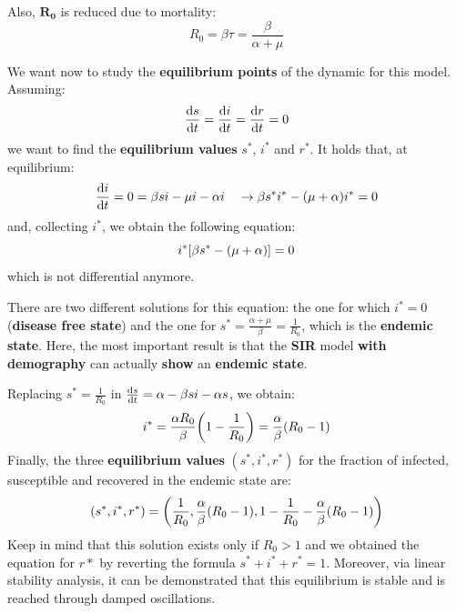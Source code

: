 \documentclass[../main/main.tex]{subfiles}
\begin{document}
Also, \( \mathbf{R_0} \) is reduced due to mortality:
\begin{equation}
  R_0 = \beta \tau = \frac{\beta }{\alpha + \mu }
\end{equation}

We want now to study the \textbf{equilibrium points} of the dynamic for this model. Assuming:
\begin{equation*}
  \dv{s}{t} = \dv{i}{t} = \dv{r}{t} = 0
\end{equation*}
we want to find the \textbf{equilibrium values}  \( s^* \), \( i^* \) and \( r^* \).
It holds that, at equilibrium:
\begin{equation*}
  \dv{i}{t} = 0 = \beta s i - \mu i - \alpha i \quad \rightarrow   \beta s^* i^* - (\mu + \alpha ) i^* = 0
\end{equation*}
and, collecting $i^*$, we obtain the following equation:
\begin{equation}
  i^* \qty[\beta s^* - (\mu + \alpha )] = 0
\end{equation}
which is not differential anymore.

There are two different solutions for this equation: the one for which \( i^* = 0 \) (\textbf{disease free state}) and the one for \( s^* = \frac{\alpha + \mu }{\beta } = \frac{1}{R_0} \), which is the \textbf{endemic state}. Here, the most important result is that the \textbf{SIR} model \textbf{with demography} can actually \textbf{show} an \textbf{endemic state}.

Replacing \( s^* = \frac{1}{R_0} \) in \( \dv{s}{t} = \alpha - \beta s i - \alpha s  \), we obtain:
\begin{equation*}
  i^* = \frac{\alpha R_0 }{\beta } \qty(1 - \frac{1}{R_0}) = \frac{\alpha }{\beta } (R_0 -1)
\end{equation*}
Finally, the three \textbf{equilibrium values} $(s^*, i^*, r^*)$ for the fraction of infected, susceptible and recovered in the endemic state are:
\begin{equation}
  (s^*, i^*, r^*) = \qty( \frac{1}{R_0}, \frac{\alpha }{\beta } (R_0 -1 ), 1- \frac{1}{R_0} - \frac{\alpha }{\beta } (R_0-1))
\end{equation}
Keep in mind that this solution exists only if \( R_0>1 \) and we obtained the equation for $r*$ by reverting the formula $s^* +  i^* + r^* = 1$. Moreover, via linear stability analysis, it can be demonstrated that this equilibrium is stable and is reached through damped oscillations.
\end{document}
